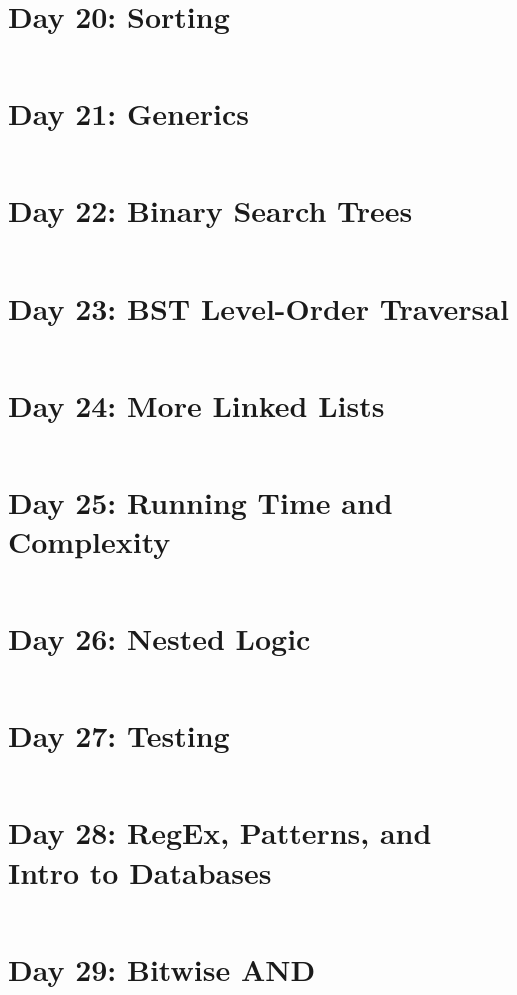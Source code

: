 \documentclass[11pt,a4paper]{article}
\begin{document}
\newpage
\section{Day 20: Sorting}
\begin{lstlisting}
\end{lstlisting}

\newpage
\section{Day 21: Generics}
\begin{lstlisting}
\end{lstlisting}

\newpage
\section{Day 22: Binary Search Trees}
\begin{lstlisting}
\end{lstlisting}

\newpage
\section{Day 23: BST Level-Order Traversal}
\begin{lstlisting}
\end{lstlisting}

\newpage
\section{Day 24: More Linked Lists}
\begin{lstlisting}
\end{lstlisting}

\newpage
\section{Day 25: Running Time and Complexity}
\begin{lstlisting}
\end{lstlisting}

\newpage
\section{Day 26: Nested Logic}
\begin{lstlisting}
\end{lstlisting}

\newpage
\section{Day 27: Testing}
\begin{lstlisting}
\end{lstlisting}

\newpage
\section{Day 28: RegEx, Patterns, and Intro to Databases}
\begin{lstlisting}
\end{lstlisting}

\newpage
\section{Day 29: Bitwise AND}
\begin{lstlisting}
\end{lstlisting}
\end{document}
